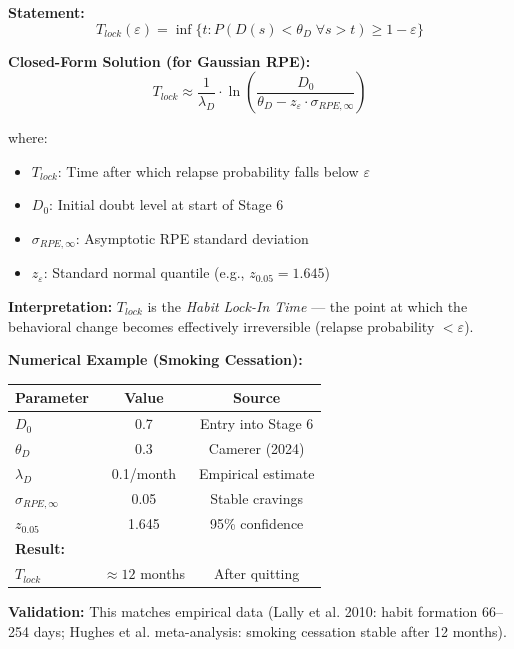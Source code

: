 \begin{tcolorbox}[colback=gray!5!white, colframe=gray!75!black,
    title=Axiom BCJ-AP4: Habit Lock-In Time]
\textbf{Statement:}
\begin{equation}
T_{lock}(\varepsilon) = \inf\{t : P(D(s) < \theta_D \; \forall s > t) \geq 1 - \varepsilon\}
\end{equation}

\textbf{Closed-Form Solution (for Gaussian RPE):}
\begin{equation}
\boxed{T_{lock} \approx \frac{1}{\lambda_D} \cdot \ln\left(\frac{D_0}{\theta_D - z_\varepsilon \cdot \sigma_{RPE,\infty}}\right)}
\end{equation}

where:
\begin{itemize}[nosep]
\item $T_{lock}$: Time after which relapse probability falls below $\varepsilon$
\item $D_0$: Initial doubt level at start of Stage 6
\item $\sigma_{RPE,\infty}$: Asymptotic RPE standard deviation
\item $z_\varepsilon$: Standard normal quantile (e.g., $z_{0.05} = 1.645$)
\end{itemize}

\textbf{Interpretation:} $T_{lock}$ is the \textit{Habit Lock-In Time} --- the point at which the behavioral change becomes effectively irreversible (relapse probability $< \varepsilon$).

\textbf{Numerical Example (Smoking Cessation):}
\begin{center}
\begin{tabular}{lcc}
\toprule
\textbf{Parameter} & \textbf{Value} & \textbf{Source} \\
\midrule
$D_0$ & 0.7 & Entry into Stage 6 \\
$\theta_D$ & 0.3 & Camerer (2024) \\
$\lambda_D$ & 0.1/month & Empirical estimate \\
$\sigma_{RPE,\infty}$ & 0.05 & Stable cravings \\
$z_{0.05}$ & 1.645 & 95\% confidence \\
\midrule
\multicolumn{3}{l}{\textbf{Result:}} \\
$T_{lock}$ & $\approx 12$ months & After quitting \\
\bottomrule
\end{tabular}
\end{center}

\textbf{Validation:} This matches empirical data (Lally et al. 2010: habit formation 66--254 days; Hughes et al. meta-analysis: smoking cessation stable after 12 months).
\end{tcolorbox}


